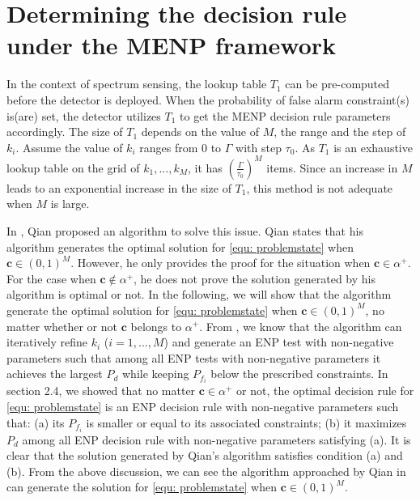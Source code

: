 
\section{Determining the decision rule under the MENP framework}
In the context of spectrum sensing, the lookup table $T_1$ can be pre-computed  before the detector is deployed. When the probability of false alarm constraint(s) is(are) set, the detector utilizes $T_1$ to get the MENP decision  rule parameters accordingly. The size of $T_1$ depends on the value of $M$, the range and the step of $k_i$.  Assume the value of $k_i$ ranges from $0$ to $\Gamma$ with step $\tau_0$. As $T_1$ is an exhaustive lookup table on the grid of $k_1, ..., k_M$, it has $(\frac{\Gamma}{\tau_0})^M$ items. Since an increase in $M$ leads to an exponential increase in the size of $T_1$, this method is not adequate when $M$ is large. 

In \cite{zhang1999design, zhang2000efficient}, Qian proposed an algorithm to solve this issue. 
Qian states that his algorithm generates the optimal solution for \eqref{equ: problemstate} when $\mathbf{c} \in (0, 1)^M$.
However, he only provides the proof for the situation when $\mathbf{c} \in \alpha^+$. For the case when $\mathbf{c} \notin \alpha^+$, he does not prove the solution generated by his algorithm is optimal or not.  
In the following, we will show that the algorithm generate the optimal solution for \eqref{equ: problemstate} when $\mathbf{c} \in (0, 1)^M$, no matter whether or not $\mathbf{c}$ belongs to $\alpha^+$. 
From \cite{zhang1999design, zhang2000efficient}, we know that the algorithm can iteratively refine $k_i$ ($i=1, ..., M$) and generate an ENP test with non-negative parameters such that among all ENP tests with non-negative parameters it achieves the largest $P_d$ while keeping $P_{f_i}$ below the prescribed constraints. 
In section 2.4, we showed that no matter $\mathbf{c} \in \alpha^+$ or not, the optimal decision rule for \eqref{equ: problemstate} is an ENP decision rule  with non-negative parameters such that: (a) its $P_{f_i}$ is smaller or equal to its associated constraints; (b) it maximizes $P_d$ among all ENP decision rule with non-negative parameters satisfying (a).  
It is clear that the solution generated by Qian's algorithm satisfies condition (a) and (b).
From the above discussion, we can see the  algorithm approached by Qian in \cite{zhang1999design, zhang2000efficient} can generate the solution for \eqref{equ: problemstate} when $\mathbf{c} \in (0, 1)^M$.

